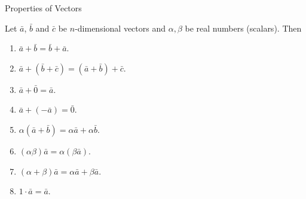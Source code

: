 \documentclass[aspectratio=169, UTF8]{ctexbeamer}
\begin{document}
    \begin{frame}[t]{Properties of Vectors}
        \par Let $\bar{a}$, $\bar{b}$ and $\bar{c}$ be $n$-dimensional vectors and $\alpha,\beta$ be real numbers (scalars). Then 
        \begin{enumerate}
            \item $\bar{a} + \bar{b} = \bar{b} + \bar{a}$.
            \item $\bar{a} + (\bar{b} + \bar{c}) = (\bar{a} + \bar{b}) + \bar{c}$.
            \item $\bar{a} + \bar{0} = \bar{a}$.
            \item $\bar{a} + (-\bar{a}) = \bar{0}$.
            \item $\alpha (\bar{a} + \bar{b}) = \alpha\bar{a} + \alpha\bar{b}$.
            \item $(\alpha \beta)\bar{a} = \alpha (\beta \bar{a})$.
            \item $(\alpha + \beta)\bar{a} = \alpha \bar{a} + \beta \bar{a}$.
            \item $1 \cdot \bar{a} = \bar{a}$.
        \end{enumerate}
    \end{frame} 
\end{document}
